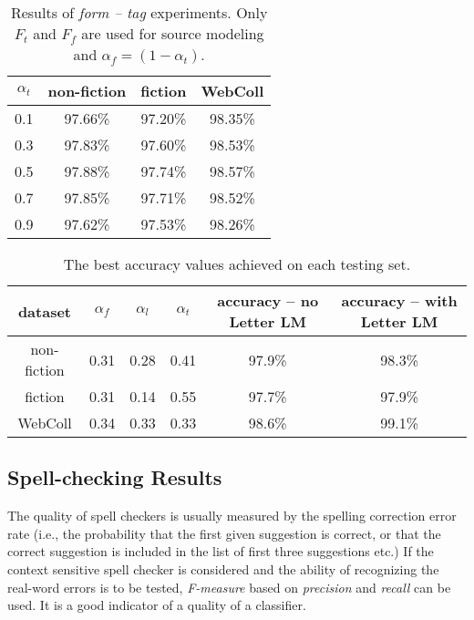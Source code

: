 \documentclass[11pt]{article}
\begin{document}
\begin{table}
    \begin{center}
    \begin{tabular}{ c || c | c | c }
    $\alpha_t$ & non-fiction & fiction & WebColl\\
    \hline
    0.1 & 97.66\% & 97.20\% & 98.35\%\\
    0.3 & 97.83\% & 97.60\% & 98.53\%\\
    0.5 & 97.88\% & 97.74\% & 98.57\%\\
    0.7 & 97.85\% & 97.71\% & 98.52\%\\
    0.9 & 97.62\% & 97.53\% & 98.26\%\\
    \end{tabular}
    \end{center}
    \caption{Results of \emph{form -- tag} experiments. Only $F_t$ and $F_f$ are
    used for source modeling and $\alpha_f = (1 - \alpha_t)$.}
    \label{tab:diacritic_form_tag}
\end{table}

\begin{table*}
    \begin{center}
    \begin{tabular}{ c || c | c | c || c | c}
        dataset & $\alpha_f$ & $\alpha_l$ & $\alpha_t$ & accuracy -- no Letter LM & accuracy -- with Letter LM\\
        \hline
        non-fiction & 0.31 & 0.28 & 0.41 & 97.9\% & 98.3\%\\
        fiction & 0.31 & 0.14 & 0.55 & 97.7\% & 97.9\%\\
        WebColl & 0.34 & 0.33 & 0.33 & 98.6\% & 99.1\%
    \end{tabular}
    \end{center}
    \caption{The best accuracy values achieved on each testing set.}
    \label{tab:hill_climb1}
\end{table*}

\subsection{Spell-checking Results}
The quality of spell checkers is usually measured by the spelling correction
error rate (i.e., the probability that the first given suggestion is
correct, or that the correct suggestion is included in the list of first three
suggestions etc.) If the context sensitive spell checker is considered and the
ability of recognizing the real-word errors is to be tested, \emph{F-measure}
based on \emph{precision} and \emph{recall} can be used.
It is a good indicator of a quality of a classifier.
\end{document}
